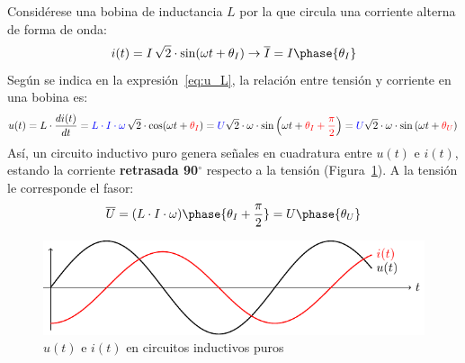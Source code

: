 Considérese una bobina de inductancia $L$ por la que circula una
corriente alterna de forma de onda:
\begin{equation*}
  i(t)=I\,\sqrt{2}\cdot\sin(\omega t+\theta_I)\rightarrow\overline{I}=I\phase{\theta_I}
\end{equation*}
Según se indica en la expresión~\eqref{eq:u_L}, la relación entre
tensión y corriente en una bobina es:
\begin{equation*}
  u(t)=L\cdot\dfrac{di(t)}{dt}={\color{blue}L\cdot I \cdot \omega}\,\sqrt{2}\cdot  \cos(\omega t+{\color{red}\theta_I})= {\color{blue} U} \sqrt{2}\cdot \omega\cdot  \sin \left(\omega t+{\color{red}\theta_I+\frac{\pi}{2}}\right)= {\color{blue} U} \sqrt{2}\cdot \omega\cdot  \sin \left(\omega t+{\color{red}\theta_U}\right)\,
\end{equation*}
Así, un circuito inductivo puro genera señales en cuadratura entre
$u(t)$ e $i(t)$, estando la corriente \textbf{retrasada 90$^\circ$}
respecto a la tensión (Figura~\ref{fig:inductivoPuro}). A la tensión
le corresponde el fasor:
\begin{equation*}
  \overline{U}=(L\cdot I\cdot\omega)\phase{\theta_I+\frac{\pi}{2}}=U\phase{\theta_U}
\end{equation*}
\begin{figure}[H]
  \centering \includegraphics{../figs/inductivoPuro.pdf}
  \caption{$u(t)$ e $i(t)$ en circuitos inductivos puros}
  \label{fig:inductivoPuro}
\end{figure}
	
